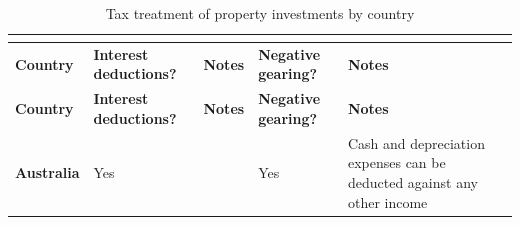 \begin{subappendices}
\begin{longtable}[r]{>{\footnotesize\bfseries}l@{}>{\footnotesize\raggedleft}p{1.75cm}>{\footnotesize\raggedright}p{3.00cm}>{\footnotesize\raggedleft}p{1.95cm}>{\footnotesize\raggedright\arraybackslash}p{3.22cm}}
\captionsetup{justification=centering}
\caption{Tax treatment of property investments by country\label{tbl:CGT-5}} \\
    \toprule
    \textbf{Country} & \textbf{Interest \mbox{deductions?}} & \textbf{Notes} & \textbf{Negative gearing?} & \textbf{Notes} \\
    \midrule 
	\endfirsthead
    \toprule
    \textbf{Country} & \textbf{Interest \mbox{deductions?}} & \textbf{Notes} & \textbf{Negative gearing?} & \textbf{Notes} \\
    \midrule 
    \endhead
    \bottomrule
    \endfoot
    Australia & Yes   &       & Yes   & Cash and depreciation expenses can be deducted against any other income \\


\end{longtable}
\end{subappendices}
